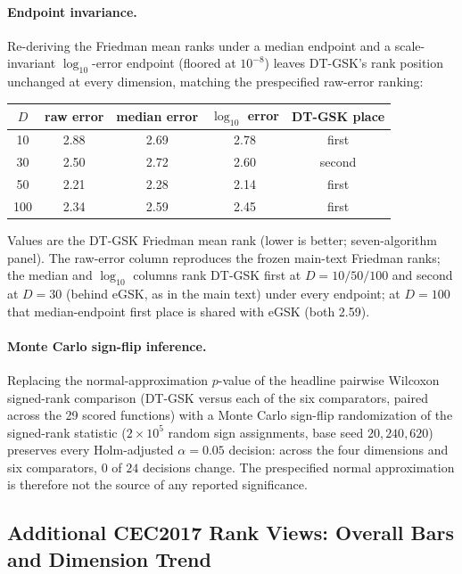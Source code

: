 \documentclass[algorithms,article,submit,moreauthors,pdftex]{Definitions/mdpi}
\newcommand{\dtgsk}{DT-GSK}
\newcommand{\egsk}{eGSK}
\begin{document}
\paragraph{Endpoint invariance.}
Re-deriving the Friedman mean ranks under a median endpoint and a
scale-invariant $\log_{10}$-error endpoint (floored at $10^{-8}$) leaves
\dtgsk{}'s rank position unchanged at every dimension, matching the
prespecified raw-error ranking:
\begin{center}
\small
\begin{tabular}{ccccc}
\toprule
$D$ & raw error & median error & $\log_{10}$ error & \dtgsk{} place\\
\midrule
10  & 2.88 & 2.69 & 2.78 & first\\
30  & 2.50 & 2.72 & 2.60 & second\\
50  & 2.21 & 2.28 & 2.14 & first\\
100 & 2.34 & 2.59 & 2.45 & first\\
\bottomrule
\end{tabular}
\end{center}
Values are the \dtgsk{} Friedman mean rank (lower is better; seven-algorithm
panel).  The raw-error column reproduces the frozen main-text Friedman ranks;
the median and $\log_{10}$ columns rank \dtgsk{} first at $D=10/50/100$ and
second at $D=30$ (behind \egsk{}, as in the main text) under every endpoint;
at $D=100$ that median-endpoint first place is shared with \egsk{} (both 2.59).

\paragraph{Monte Carlo sign-flip inference.}
Replacing the normal-approximation $p$-value of the headline pairwise Wilcoxon
signed-rank comparison (\dtgsk{} versus each of the six comparators, paired
across the 29 scored functions) with a Monte Carlo sign-flip randomization of the
signed-rank statistic ($2\times10^{5}$ random sign assignments, base seed $20{,}240{,}620$)
preserves every Holm-adjusted $\alpha=0.05$ decision: across the four dimensions
and six comparators, $0$ of $24$ decisions change.  The prespecified normal
approximation is therefore not the source of any reported significance.

\subsection{Additional CEC2017 Rank Views: Overall Bars and Dimension Trend}\label{sec:supp:rankviews}
\end{document}
